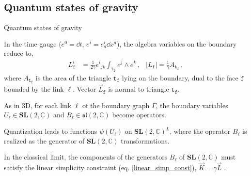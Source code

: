 \documentclass{beamer}
\begin{document}
\subsection{Quantum states of gravity}

\begin{frame}{Quantum states of gravity}
    \begin{list}{\maltese}{\leftmargin=1em \itemindent=0em}
        \item<1-> In the time gauge ($e^0=\dd{t}$, $e^i=e^i_a\dd{x^a}$), the algebra variables on the boundary reduce to,
        \begin{align}
            L^i_\mathtt{f}&=\frac{1}{2\gamma}{\epsilon^{i}}_{jk}\int_{\mathtt{t_\mathtt{f}}}e^j\wedge e^k\,, & \lvert L_\mathtt{f} \rvert =\frac{1}{\gamma} A_{\mathtt{t_\mathtt{f}}}\,,
        \end{align}
        where $A_{\mathtt{t_\mathtt{f}}}$ is the area of the triangle $\mathtt{t_\mathtt{f}}$ lying on the boundary, dual to the face $\mathtt{f}$ bounded by the link $\ell$. Vector $\vec{L}_\mathtt{f}$ is normal to triangle $\mathtt{t_\mathtt{f}}$.
        \item<2-> As in 3D, for each link $\ell$ of the boundary graph $\Gamma$, the boundary variables $U_\ell\in\mathbf{SL}(2,\mathbb{C})$ and $B_\ell\in\mathfrak{sl}(2,\mathbb{C})$ become operators.
        \item<3-> Quantization leads to functions $\psi(U_\ell)$ on ${\mathbf{SL}(2,\mathbb{C})}^L$, where the operator $B_\ell$ is realized as the generator of $\mathbf{SL}(2,\mathbb{C})$ transformations.
        \item<4-> In the classical limit, the components of the generators $B_\ell$ of $\mathbf{SL}(2,\mathbb{C})$ must satisfy the linear simplicity constraint (eq. \ref{linear_simp_const}), $\vec{K}=\gamma\vec{L}$ .
    \end{list}
\end{frame}
\end{document}
